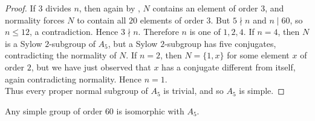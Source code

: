 \documentclass[../Odyssey_Project.tex]{subfiles}
\begin{document}
\begin{proof}
If $3$ divides $n$, then again by , $N$ contains an element of order $3$, and normality forces $N$ to contain all $20$ elements of order $3$. But $5\nmid n$ and $n\mid 60$, so $n\leq 12$, a contradiction. Hence $3\nmid n$. Therefore $n$ is one of $1,2,4$. If $n=4$, then $N$ is a Sylow $2$-subgroup of $A_5$, but a Sylow $2$-subgroup has five conjugates, contradicting the normality of $N$. If $n=2$, then $N=\{1,x\}$ for some element $x$ of order $2$, but we have just observed that $x$ has a conjugate different from itself, again contradicting normality. Hence $n=1$.\\
Thus every proper normal subgroup of $A_5$ is trivial, and so $A_5$ is simple.
\end{proof}

\begin{theorem}
\label{thm:7.5}
Any simple group of order $60$ is isomorphic with $A_5$.
\end{theorem}
\end{document}
